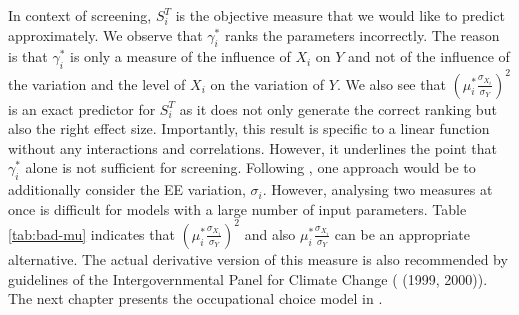 \noindent
In context of screening, $S_i^T$ is the objective measure that we would like to predict approximately. We observe that $\gamma_i^*$ ranks the parameters incorrectly. The reason is that $\gamma_i^*$ is only a measure of the influence of $X_i$ on $Y$ and not of the influence of the variation and the level of $X_i$ on the variation of $Y$. We also see that $(\mu_i^* \frac{\sigma_{X_i}}{\sigma_Y})^2$ is an exact predictor for $S_i^T$ as it does not only generate the correct ranking but also the right effect size. Importantly, this result is specific to a linear function without any interactions and correlations. However, it underlines the point that $\gamma_i^*$ alone is not sufficient for screening. Following \cite{ge2017extending}, one approach would be to additionally consider the EE variation, $\sigma_i$. However, analysing two measures at once is difficult for models with a large number of input parameters. Table \ref{tab:bad-mu} indicates that $(\mu_i^* \frac{\sigma_{X_i}}{\sigma_Y})^2$ and also $\mu_i^* \frac{\sigma_{X_i}}{\sigma_Y}$ can be an appropriate alternative. The actual derivative version of this measure is also recommended by guidelines of the Intergovernmental Panel for Climate Change (\citeauthor{ipcc1999} (1999, 2000)).\\



\noindent
The next chapter presents the occupational choice model in \cite{Keane.1994}.


